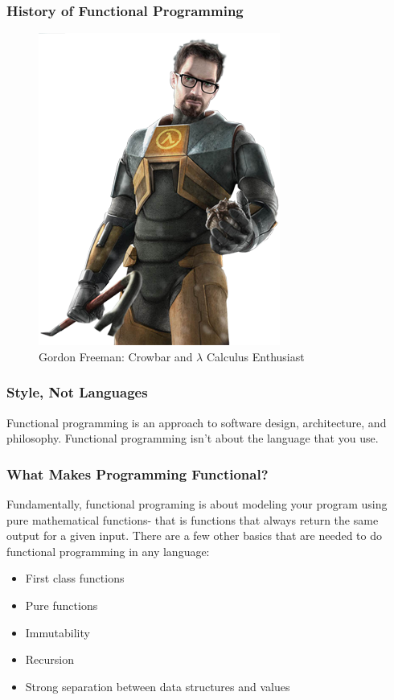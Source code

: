 \documentclass{beamer}
\begin{document}
\begin{frame}
  \frametitle{History of Functional Programming}
  \begin{center}
    \begin{figure}
      \includegraphics[height=.70\paperheight]{images/freeman.png}
      \caption{Gordon Freeman: Crowbar and $\lambda$ Calculus Enthusiast}
      \end{figure}
  \end{center}
\end{frame}

\begin{frame}
  \frametitle{Style, Not Languages}
  Functional programming is an approach to software design,
  architecture, and philosophy.  Functional programming isn't about
  the language that you use.
\end{frame}

\begin{frame}
  \frametitle{What Makes Programming Functional?}
  Fundamentally, functional programing is about modeling your program
  using pure mathematical functions- that is functions that always
  return the same output for a given input.  There are a few other
  basics that are needed to do functional programming in any language:
  \begin{itemize}
    \item First class functions
    \item Pure functions
    \item Immutability
    \item Recursion
    \item Strong separation between data structures and values
  \end{itemize}
\end{frame}
\end{document}
